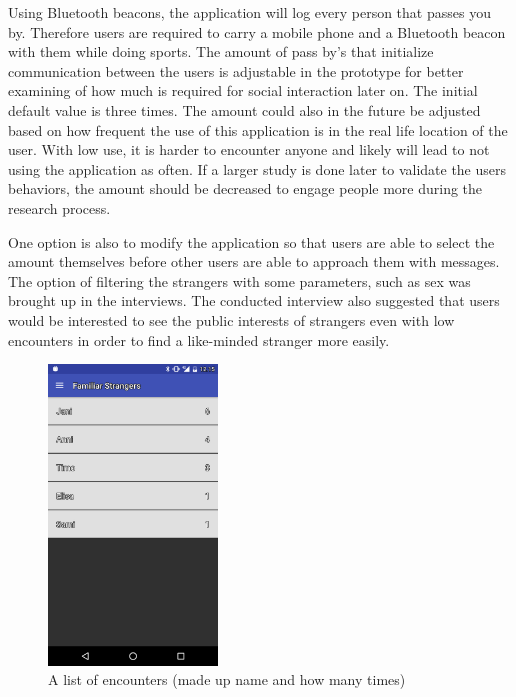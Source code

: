 Using Bluetooth beacons, the application will log every person that passes you by. Therefore users are required to carry a mobile phone and a Bluetooth beacon with them while doing sports. The amount of pass by's that initialize communication between the users is adjustable in the prototype for better examining of how much is required for social interaction later on. The initial default value is three times. The amount could also in the future be adjusted based on how frequent the use of this application is in the real life location of the user. With low use, it is harder to encounter anyone and likely will lead to not using the application as often. If a larger study is done later to validate the users behaviors, the amount should be decreased to engage people more during the research process.

One option is also to modify the application so that users are able to select the amount themselves before other users are able to approach them with messages. The option of filtering the strangers with some parameters, such as sex was brought up in the interviews. The conducted interview also suggested that users would be interested to see the public interests of strangers even with low encounters in order to find a like-minded stranger more easily.

\begin{figure}[htb]
	\begin{center}
		\includegraphics[width=0.4\textwidth]{encounters.png}
		\caption{A list of encounters (made up name and how many times)}	
		\label{fig:encounters}
	\end{center}
\end{figure}


